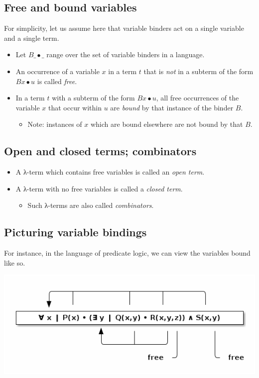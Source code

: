 \documentclass[11pt]{article}
\theoremstyle{definition}
\begin{document}
\subsection{Free and bound variables}
\label{sec:orga4c82c9}

For simplicity, let us assume here that variable binders
act on a single variable and a single term.
\begin{itemize}
\item Let \(B\_•\_\) range over the set of variable binders in a language.
\item An occurrence of a variable \(x\) in a term \(t\) that is \emph{not} in
a subterm of the form \(B x • u\) is called \emph{free}.
\item In a term \(t\) with a subterm of the form \(B x • u\),
all free occurrences of the variable \(x\) that occur within \(u\)
are \emph{bound} by that instance of the binder \(B\).
\begin{itemize}
\item Note: instances of \(x\) which are bound elsewhere are not bound
by that \(B\).
\end{itemize}
\end{itemize}

\subsection{Open and closed terms; combinators}
\label{sec:org97349ad}

\begin{itemize}
\item A λ-term which contains free variables is called an \emph{open term}.

\item A λ-term with no free variables is called a \emph{closed term}.
\begin{itemize}
\item Such λ-terms are also called \emph{combinators}.
\end{itemize}
\end{itemize}

\subsection{Picturing variable bindings}
\label{sec:orgc241257}
For instance, in the language of predicate logic,
we can view the variables bound like so.
\begin{center}
\includegraphics[width=\textwidth]{media/variable-binding.png}
\end{center}
\end{document}

